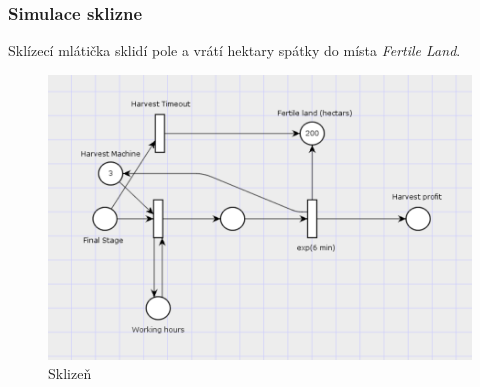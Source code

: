 \documentclass[11pt,a4paper,titlepage]{article}
\begin{document}
\pagebreak

\subsubsection{Simulace sklizne}
Sklízecí mlátička sklidí pole a vrátí hektary spátky do místa \emph{Fertile Land}.

\begin{figure}[ht!]
\centering
\includegraphics[scale=0.25]{img/Harvest.png}
\caption{Sklizeň}
\end{figure}

\pagebreak
\end{document}
